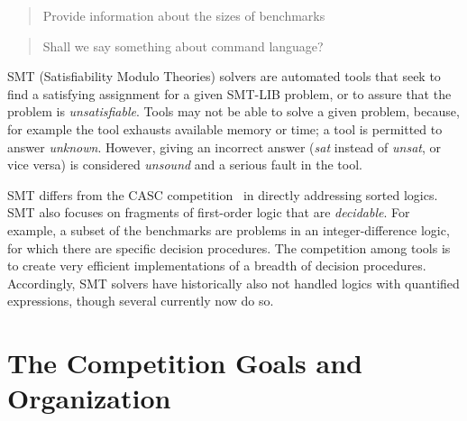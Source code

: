 \documentclass[twosize,11pt]{article}
\newcommand{\comment}[2]{\begin{quote}\sc #1\marginpar{\textcolor{red}{$\ast^{\mbox{#2}}$}}\end{quote}}
\newcommand{\tjark}[1]{\comment{#1}{TW}}
\newcommand{\davidd}[1]{\comment{#1}{DD}}
\begin{document}
\tjark{Provide information about the sizes of benchmarks}
\davidd{Shall we say something about command language?}

SMT (Satisfiability Modulo Theories) solvers are automated tools that seek to find a satisfying assignment for a given SMT-LIB problem, or to assure that the problem is \textit{unsatisfiable}.
Tools may not be able to solve a given problem, because, for example the tool exhausts available memory or time; a tool is permitted to answer \textit{unknown}. However, giving an incorrect answer (\textit{sat} instead of \textit{unsat}, or vice versa) is considered \textit{unsound} and a serious fault in the tool.

SMT differs from the CASC competition~\cite{PSS02} in directly addressing sorted logics. SMT also focuses on fragments of first-order logic that are \textit{decidable}. For example, a subset of the benchmarks are problems in an integer-difference logic, for which there are specific decision procedures. The competition among tools is to create very efficient implementations of a breadth of decision procedures. Accordingly, SMT solvers have historically also not handled logics with quantified expressions, though several currently now do so.

\section{The Competition Goals and Organization}
\label{sec:goals}
\end{document}
